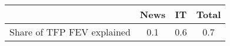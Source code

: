 \begin{small}
	\begin{tabular}{lccc}
	\hline
		& News & IT & Total \\
		\hline
		Share of TFP FEV explained & 0.1 & 0.6 & 0.7 \\
		\hline
	\end{tabular}
\end{small}
